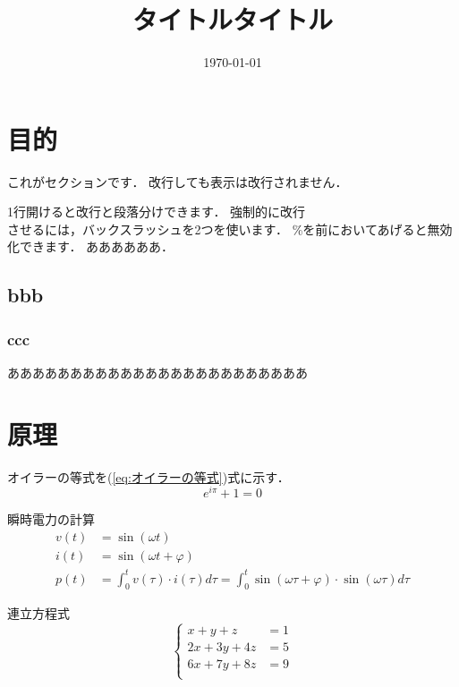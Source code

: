 \documentclass[uplatex,a4paper,11pt]{jsarticle} %
\title{タイトルタイトル}
\date{\today}
\numberwithin{equation}{section}     %
\begin{document}

\section{目的}
これがセクションです．
改行しても表示は改行されません．

1行開けると改行と段落分けできます．
強制的に改行\\させるには，バックスラッシュを2つを使います．
\%を前においてあげると無効化できます．      %
ああああああ．


\subsection{bbb}
\subsubsection{ccc}

ああああああああああああああああああああああああ

\section{原理}

オイラーの等式を(\ref{eq:オイラーの等式})式に示す．
\begin{equation}
    e^{i \pi} + 1 = 0   \label{eq:オイラーの等式}
\end{equation}

瞬時電力の計算
\begin{align}
    v(t) &= \sin\left(\omega t\right) \\
    i(t) &= \sin\left(\omega t + \varphi\right) \\
    p(t) &= \int_{0}^{t} v\left(\tau\right) \cdot i\left(\tau\right) d\tau 
            = \int_{0}^{t} \sin\left(\omega \tau + \varphi\right) \cdot \sin\left(\omega \tau \right) d\tau
\end{align}

連立方程式
\begin{equation}
    \left\{ 
    \begin{aligned}
        x + y + z &= 1 \\
        2x + 3y + 4z &= 5 \\
        6x + 7y + 8z &= 9 \\
    \end{aligned}
    \right.
\end{equation}
\end{document}
